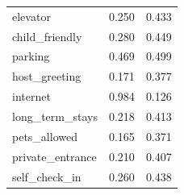 \begin{table}[htp]
{\begin{tabular}{lrr}
elevator               &     0.250 &        0.433 \\
child\_friendly         &     0.280 &        0.449 \\
parking                &     0.469 &        0.499 \\
host\_greeting          &     0.171 &        0.377 \\
internet               &     0.984 &        0.126 \\
long\_term\_stays        &     0.218 &        0.413 \\
pets\_allowed           &     0.165 &        0.371 \\
private\_entrance       &     0.210 &        0.407 \\
self\_check\_in          &     0.260 &        0.438 \\
\bottomrule
\end{tabular}
}
\end{table}

